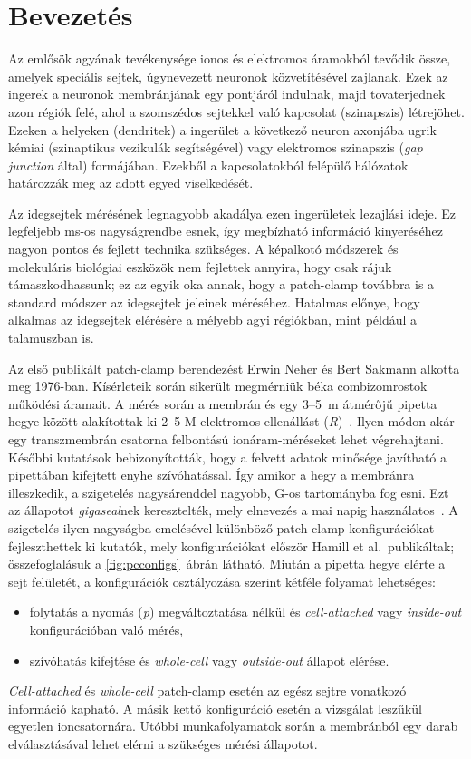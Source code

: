 \documentclass[12pt,a4paper]{report}
\begin{document}
\section*{Bevezetés}
Az emlősök agyának tevékenysége ionos és elektromos áramokból tevődik össze, amelyek speciális sejtek, úgynevezett neuronok közvetítésével zajlanak. Ezek az ingerek a neuronok membránjának egy pontjáról indulnak, majd tovaterjednek azon régiók felé, ahol a szomszédos sejtekkel való kapcsolat (szinapszis) létrejöhet. Ezeken a helyeken (dendritek) a ingerület a következő neuron axonjába ugrik kémiai (szinaptikus vezikulák segítségével) vagy elektromos szinapszis (\textit{gap junction} által) formájában. Ezekből a kapcsolatokból felépülő hálózatok határozzák meg az adott egyed viselkedését.\par
Az idegsejtek mérésének legnagyobb akadálya ezen ingerületek lezajlási ideje. Ez legfeljebb ms-os nagyságrendbe esnek, így megbízható információ kinyeréséhez nagyon pontos és fejlett technika szükséges. A képalkotó módszerek és molekuláris biológiai eszközök nem fejlettek annyira, hogy csak rájuk támaszkodhassunk; ez az egyik oka annak, hogy a patch-clamp továbbra is a standard módszer az idegsejtek jeleinek méréséhez. Hatalmas előnye, hogy alkalmas az idegsejtek elérésére a mélyebb agyi régiókban, mint például a talamuszban is.\par
Az első publikált patch-clamp berendezést Erwin Neher és Bert Sakmann alkotta meg 1976-ban. Kísérleteik során sikerült megmérniük béka combizomrostok működési áramait. A mérés során a membrán és egy 3--5~\textmu m átmérőjű pipetta hegye között  alakítottak ki 2--5 M\textOmega{} elektromos ellenállást (\textit{R})~\cite{neher1976}. Ilyen módon akár egy transzmembrán csatorna felbontású ionáram-méréseket lehet végrehajtani. Későbbi kutatások bebizonyították, hogy a felvett adatok minősége javítható a pipettában kifejtett enyhe szívóhatással. Így amikor a hegy a membránra illeszkedik, a szigetelés nagysárenddel nagyobb, G\textOmega{}-os tartományba fog esni. Ezt az állapotot \textit{gigaseal}nek keresztelték, mely elnevezés a mai napig használatos~\cite{hamill1981}. A szigetelés ilyen nagyságba emelésével különböző patch-clamp konfigurációkat fejleszthettek ki kutatók, mely konfigurációkat először Hamill et al.\ publikáltak; összefoglalásuk a \ref{fig:pcconfigs}~ábrán látható. Miután a pipetta hegye elérte a sejt felületét, a konfigurációk osztályozása szerint kétféle folyamat lehetséges:
\begin{itemize}
    \item folytatás a nyomás (\textit{p}) megváltoztatása nélkül és \textit{cell-attached} vagy \textit{inside-out} konfigurációban való mérés,
    \item szívóhatás kifejtése és \textit{whole-cell} vagy \textit{outside-out} állapot elérése.
\end{itemize}
\textit{Cell-attached} és \textit{whole-cell} patch-clamp esetén az egész sejtre vonatkozó információ kapható. A másik kettő konfiguráció esetén a vizsgálat leszűkül egyetlen ioncsatornára. Utóbbi munkafolyamatok során a membránból egy darab elválasztásával lehet elérni a szükséges mérési állapotot.
\end{document}
